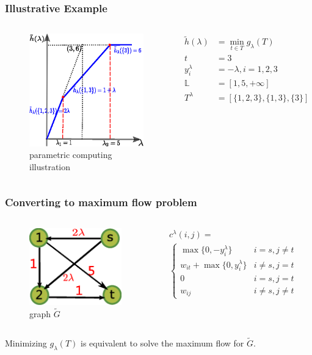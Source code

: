 \documentclass[notheorems]{beamer}
\begin{document}
\begin{frame}
	\frametitle{Illustrative Example}
\begin{columns}
	\column{5cm}
	\begin{figure}
		\includegraphics[width=5cm]{pic/example_pst_single.eps}
		\caption{parametric computing illustration}
	\end{figure}
	\column{5cm}
	\begin{align*}
	\tilde{h}(\lambda) &= \min_{t \in T} g_{\lambda}(T)\\
	t & = 3 \\
	y^{\lambda}_i & = -\lambda, i=1,2,3 \\
    \mathbb{L} & = [1, 5, +\infty] \\
	T^{\lambda} &= [\{1,2,3\}, \{1,3\}, \{3\}]
	\end{align*}
\end{columns}	
\end{frame}	
\begin{frame}
	\frametitle{Converting to maximum flow problem}
\begin{columns}
	\column{4cm}
	\begin{figure}
		\includegraphics[width=4cm]{pic/example_st.eps}
		\caption{graph $\widetilde{G}$}
	\end{figure}
	\column{6cm}
	\begin{align*}
		& c^{\lambda}(i, j)  = \\ 
		& \begin{cases}
			\max\{0, -y^{\lambda}_i\} &  i = s, j \neq t \\
			w_{it} + \max\{0, y^{\lambda}_i\} & i\neq s, j = t\\
			0 & i = s, j = t\\
			w_{ij} & i \neq s, j \neq t
		\end{cases}
	\end{align*}
\end{columns}	
Minimizing $g_{\lambda}(T)$ is equivalent to solve the maximum flow for $\widetilde{G}$.
\end{frame}	
\end{document}
